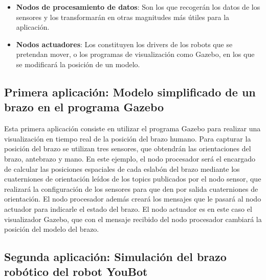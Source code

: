 \documentclass[12pt,a4paper]{article}
\begin{document}
\begin{itemize}
\item \textbf{Nodos de procesamiento de datos}: Son los que recogerán los datos de los sensores y los transformarán en otras magnitudes más útiles para la aplicación.

\item \textbf{Nodos actuadores}: Los constituyen los drivers de los robots que se pretendan mover, o los programas de visualización como Gazebo, en los que se modificará la posición de un modelo.
\end{itemize}

\subsection{Primera aplicación: Modelo simplificado de un brazo en el programa Gazebo}

Esta primera aplicación consiste en utilizar el programa Gazebo para realizar una visualización en tiempo real de la posición del brazo humano. Para capturar la posición del brazo se utilizan tres sensores, que obtendrán las orientaciones del brazo, antebrazo y mano. En este ejemplo, el nodo procesador será el encargado de calcular las posiciones espaciales de cada eslabón del brazo mediante los cuaterniones de orientación leídos de los topics publicados por el nodo sensor, que realizará la configuración de los sensores para que den por salida cuaterniones de orientación. El nodo procesador además creará los mensajes que le pasará al nodo actuador para indicarle el estado del brazo. El nodo actuador es en este caso el visualizador Gazebo, que con el mensaje recibido del nodo procesador cambiará la posición del modelo del brazo.

\subsection{Segunda aplicación: Simulación del brazo robótico del robot YouBot}
\end{document}

